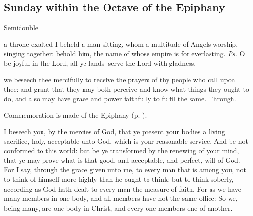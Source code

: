 \clearpage
\subsection{Sunday within the Octave of the Epiphany}
\fancyhead[RE,LO]{}
\begin{inhead}
{Semidouble}
\end{inhead}


\introit
{} a throne exalted I beheld a man sitting, whom a multitude of Angels worship, singing together: behold him, the name of whose empire is for everlasting. \textit{Ps.} O be joyful in the Lord, all ye lands: serve the Lord with gladness.

\collect
 we beseech thee mercifully to receive the prayers of thy people who call upon thee: and grant that they may both perceive and know what things they ought to do, and also may have grace and power faithfully to fulfil the same. Through.
\begin{rubric}
    Commemoration is made of the Epiphany (p. \pageref{EpiphanyMassCollect}).
\end{rubric}

 I beseech you, by the mercies of God, that ye present your bodies a living sacrifice, holy, acceptable unto God, which is your reasonable service. And be not conformed to this world: but be ye transformed by the renewing of your mind, that ye may prove what is that good, and acceptable, and perfect, will of God. For I say, through the grace given unto me, to every man that is among you, not to think of himself more highly than he ought to think; but to think soberly, according as God hath dealt to every man the measure of faith. For as we have many members in one body, and all members have not the same office: So we, being many, are one body in Christ, and every one members one of another.


